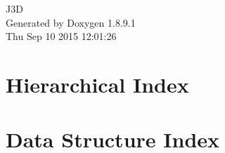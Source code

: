 \documentclass[twoside]{book}
\newcommand{\+}{\discretionary{\mbox{\scriptsize$\hookleftarrow$}}{}{}}
\newcommand{\clearemptydoublepage}{%
  \newpage{\pagestyle{empty}\cleardoublepage}%
}
\begin{document}
\hypersetup{pageanchor=false,
             bookmarks=true,
             bookmarksnumbered=true,
             pdfencoding=unicode
            }
\begin{titlepage}
\vspace*{7cm}
\begin{center}%
{\Large J3\+D }\\
\vspace*{1cm}
{\large Generated by Doxygen 1.8.9.1}\\
\vspace*{0.5cm}
{\small Thu Sep 10 2015 12:01:26}\\
\end{center}
\end{titlepage}
\clearemptydoublepage
\tableofcontents
\clearemptydoublepage
{}
\hypersetup{pageanchor=true}

\chapter{Hierarchical Index}

\chapter{Data Structure Index}

\end{document}
